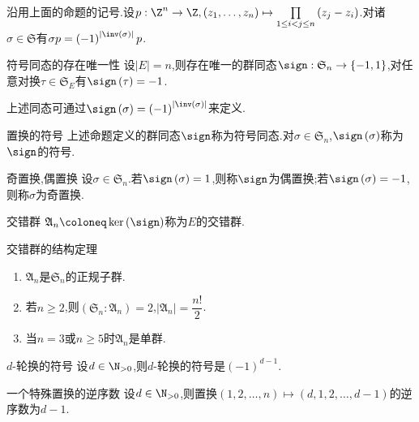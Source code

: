 \begin{lemma}{}{}
	沿用上面的命题的记号.设$p:\Z^{n}\to\Z,\left(z_{1},\ldots,z_{n}\right)\mapsto\prod\limits_{1\leq i<j\leq n}\left(z_{j}-z_{i}\right)$.对诸$\sigma\in\mathfrak{S}$有$\sigma p=\left(-1\right)^{\left|\inv\left(\sigma\right)\right|}p$.
\end{lemma}

\begin{proposition}{符号同态的存在唯一性}{}
	设$\left|E\right|=n$,则存在唯一的群同态$\sign:\mathfrak{S}_{n}\to\left\{-1,1\right\}$,对任意对换$\tau\in\mathfrak{S}_{E}$有$\sign\left(\tau\right)=-1$.
	
	上述同态可通过$\sign\left(\sigma\right)=\left(-1\right)^{\left|\inv\left(\sigma\right)\right|}$来定义.
\end{proposition}

\begin{definition}{置换的符号}{}
	上述命题定义的群同态$\sign$称为符号同态.对$\sigma\in\mathfrak{S}_{n}$,$\sign\left(\sigma\right)$称为$\sign$的符号.
\end{definition}

\begin{definition}{奇置换,偶置换}{}
	设$\sigma\in\mathfrak{S}_{n}$.若$\sign\left(\sigma\right)=1$,则称$\sign$为偶置换;若$\sign\left(\sigma\right)=-1$,则称$\sigma$为奇置换.
\end{definition}

\begin{definition}{交错群}{}
	$\mathfrak{A}_{n}\coloneq\ker\left(\sign\right)$称为$E$的交错群.
\end{definition}

\begin{proposition}{交错群的结构定理}{}
	\begin{enumerate}
		\item $\mathfrak{A}_{n}$是$\mathfrak{S}_{n}$的正规子群.
		\item 若$n\geq 2$,则$\left(\mathfrak{S}_{n}:\mathfrak{A}_{n}\right)=2$,$\left|\mathfrak{A}_{n}\right|=\dfrac{n!}{2}$.
		\item 当$n=3$或$n\geq 5$时$\mathfrak{A}_{n}$是单群.
	\end{enumerate}
\end{proposition}

\begin{example}{$d$-轮换的符号}{}
	设$d\in\N_{>0}$,则$d$-轮换的符号是$\left(-1\right)^{d-1}$.
\end{example}

\begin{example}{一个特殊置换的逆序数}{}
	设$d\in\N_{>0}$,则置换$\left(1,2,\ldots,n\right)\mapsto\left(d,1,2,\ldots,d-1\right)$的逆序数为$d-1$.
\end{example}

















